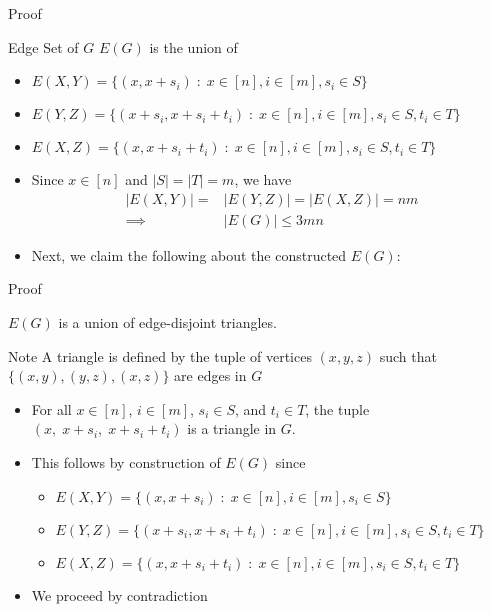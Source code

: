 \begin{frame}{Proof}

\begin{block}{Edge Set of $G$}
$E(G)$ is the union of
\begin{itemize}
	\item $E(X,Y) = \big\lbrace (x, x+s_i)\;\colon\; x\in [n], i \in [m], s_i \in S \big\rbrace$
	\item $E(Y,Z) = \big\lbrace (x+s_i, x+s_i+t_i)\;\colon\; x\in[n], i\in[m], s_i \in S, t_i \in T \big\rbrace$
	\item $E(X,Z) = \big\lbrace (x, x+s_i+t_i)\;\colon\; x\in[n], i\in[m], s_i \in S, t_i \in T \big\rbrace$
\end{itemize}
\end{block}
\begin{itemize}
	\item<2-> Since $x \in [n]$ and $|S|=|T|=m$, we have
	\begin{align*}
	|E(X,Y)| = &|E(Y,Z)| = |E(X,Z)| = nm\\
	\implies &|E(G)| \leq 3mn
	\end{align*}
	
	\item<3-> Next, we claim the following about the constructed $E(G)$:
\end{itemize}

\end{frame}

\begin{frame}{Proof}

{
\begin{claim}
	$E(G)$ is a union of edge-disjoint triangles.
\end{claim}}

\begin{block}{Note}
	A triangle is defined by the tuple of vertices $(x,y,z)$ such that $\big\lbrace (x,y), (y,z), (x,z) \big\rbrace$ are edges in $G$
\end{block}

\begin{itemize}
	\item<2-> For all $x\in [n]$, $i\in [m]$, $s_i \in S$, and $t_i \in T$, the tuple $(x,\; x+s_i,\; x+s_i+t_i)$ is a triangle in $G$.
	
	\item<3-> This follows by construction of $E(G)$ since
	\begin{itemize}
		\item $E(X,Y) = \big\lbrace (x, x+s_i)\;\colon\; x\in [n], i \in [m], s_i \in S \big\rbrace$
		\item $E(Y,Z) = \big\lbrace (x+s_i, x+s_i+t_i)\;\colon\; x\in[n], i\in[m], s_i \in S, t_i \in T \big\rbrace$
		\item $E(X,Z) = \big\lbrace (x, x+s_i+t_i)\;\colon\; x\in[n], i\in[m], s_i \in S, t_i \in T \big\rbrace$
	\end{itemize}
	\item<4-> We proceed by contradiction
\end{itemize}
\end{frame}

